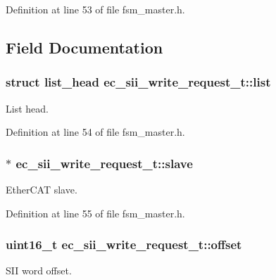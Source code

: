 Definition at line 53 of file fsm\-\_\-master.\-h.



\subsection{Field Documentation}
\subsubsection[{list}]{\setlength{\rightskip}{0pt plus 5cm}struct list\-\_\-head ec\-\_\-sii\-\_\-write\-\_\-request\-\_\-t\-::list}\label{structec__sii__write__request__t_a08c68d50c7e2fecfff3d1f54ede50b60}


List head. 



Definition at line 54 of file fsm\-\_\-master.\-h.

\subsubsection[{slave}]{$\ast$ ec\-\_\-sii\-\_\-write\-\_\-request\-\_\-t\-::slave}\label{structec__sii__write__request__t_a1fb11a824ca776c9725157703c64a351}


Ether\-C\-A\-T slave. 



Definition at line 55 of file fsm\-\_\-master.\-h.

\subsubsection[{offset}]{\setlength{\rightskip}{0pt plus 5cm}uint16\-\_\-t ec\-\_\-sii\-\_\-write\-\_\-request\-\_\-t\-::offset}\label{structec__sii__write__request__t_a9b70af97dacc5056389bcde6ac1cf107}


S\-I\-I word offset. 



